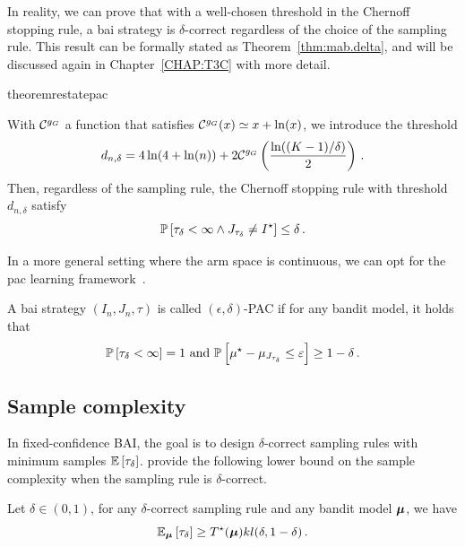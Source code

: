 In reality, we can prove that with a well-chosen threshold in the Chernoff stopping rule, a \gls{bai} strategy is $\delta$-correct regardless of the choice of the sampling rule. This result can be formally stated as Theorem~\ref{thm:mab.delta}, and will be discussed again in Chapter~\ref{CHAP:T3C} with more detail.

\begin{restatable}{theorem}{restatepac}\label{thm:mab.delta}
\begin{leftbar}[theorembar]
With $\mathcal{C}^{g_G}$ a function that satisfies $\mathcal{C}^{g_G}(x) \simeq x+\ln(x)$, we introduce the threshold
\begin{equation}
    d_{n,\delta} = 4\ln(4+\ln(n)) + 2 \mathcal{C}^{g_G}\left(\frac{\ln((K-1)/\delta)}{2}\right)\,.\label{def:mab.threshold_d}
\end{equation}
Then, regardless of the sampling rule, the Chernoff stopping rule with threshold $d_{n,\delta}$ satisfy 
\[ 
    \mathbb{P}\left[\tau_{\delta} < \infty \wedge J_{\tau_{\delta}} \neq I^\star\right] \leq \delta\,.
\]
\end{leftbar}
\end{restatable}

In a more general setting where the arm space is continuous, we can opt for the \gls{pac} learning framework~\citep{valiant1984pac}.

\begin{definition}\label{def:mab.pac}
\begin{leftbar}[defnbar]
A \gls{bai} strategy $(I_n,J_n,\tau)$ is called $(\epsilon,\delta)$-PAC if for any bandit model, it holds that
\[
	\mathbb{P}\left[\tau_\delta < \infty\right] = 1 \text{ and } \mathbb{P}\left[\mu^\star-\mu_{J_{\tau_\delta}}\leq \varepsilon\right] \geq 1-\delta\,.
\]
\end{leftbar}
\end{definition}

\subsection{Sample complexity}\label{sec:mab.performance.sample}

In fixed-confidence BAI, the goal is to design $\delta$-correct sampling rules with minimum samples $\mathbb{E}\left[\tau_\delta\right]$. \cite{garivier2016tracknstop} provide the following lower bound on the sample complexity when the sampling rule is $\delta$-correct.

\begin{theorem}\label{thm:mab.lb}
\begin{leftbar}
Let $\delta\in (0,1)$, for any $\delta$-correct sampling rule and any bandit model ${\boldsymbol \mu}$, we have
\[
    \mathbb{E}_{{\boldsymbol \mu}}\left[\tau_\delta\right] \geq T^\star({\boldsymbol \mu})kl(\delta,1-\delta)\,.
\]
\end{leftbar}
\end{theorem}

